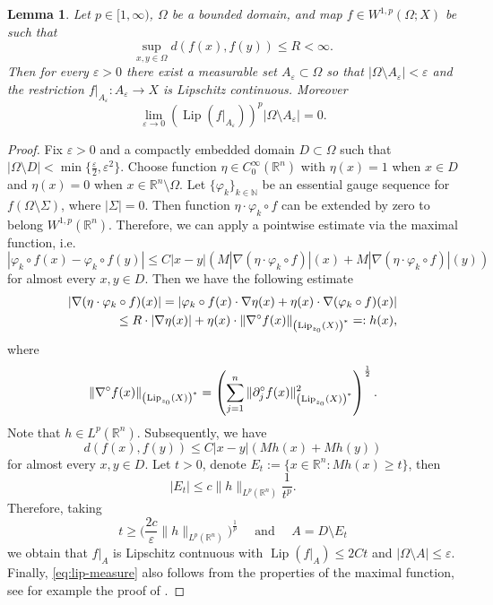 \documentclass[reqno]{amsart}
\newtheorem{lem}[thm]{Lemma}
\begin{document}
\begin{lem}\label{lemma:SobLip}
Let $p\in[1,\infty)$, $\Omega$ be a bounded domain, and map $f \in W^{1,p}(\Omega; X)$ be such that 
\[
\sup_{x,y\in\Omega} d(f(x), f(y)) \leq R <\infty.
\]
Then for every $\varepsilon>0$ there exist a measurable set $A_{\varepsilon}\subset\Omega$
so that $|\Omega\setminus A_\varepsilon|<\varepsilon$ and
the restriction $f|_{A_\varepsilon}:A_\varepsilon\to X$ is Lipschitz continuous. 
Moreover 
\begin{equation}\label{eq:lip-measure}
\lim_{\varepsilon\to 0} \left( \operatorname{Lip}(f|_{A_\varepsilon})\right)^p|\Omega\setminus A_\varepsilon| = 0.
\end{equation}
\end{lem}
\begin{proof}
Fix $\varepsilon>0$ and a compactly embedded domain $D\subset\Omega$ such that $|\Omega\setminus D|<
\min\{\frac{\varepsilon}{2}, \varepsilon^2\}$.
Choose function $\eta\in C^{\infty}_0(\mathbb R^n)$ with $\eta(x)=1$ when $x\in D$ and $\eta(x) = 0$ when $x\in \mathbb R^n\setminus \Omega$.
Let $\{\varphi_k\}_{k\in\mathbb N}$ be an essential gauge sequence for $f(\Omega\setminus\Sigma)$, where $|\Sigma|=0$.
Then function $\eta\cdot\varphi_k\circ f$ can be extended by zero to belong $W^{1,p}(\mathbb R^n)$.
Therefore, we can apply a pointwise estimate via the maximal function, i.e. 
\[
|\varphi_k\circ f(x) - \varphi_k\circ f(y)| \leq
C|x-y|(M|\nabla (\eta\cdot\varphi_k\circ f)|(x) + M|\nabla (\eta\cdot\varphi_k\circ f)|(y))
\]
for almost every $x,y\in D$. Then we have the following estimate
\begin{align}
|\nabla( \eta\cdot\varphi_k\circ f)(x)| = | \varphi_k\circ f(x)\cdot\nabla \eta(x) + \eta(x)\cdot\nabla( \varphi_k\circ f)(x)|\\
\leq R\cdot|\nabla \eta(x)| + \eta(x) \cdot  \|\nabla^\circ f(x)\|_{\left(\textnormal{Lip}_{z_0}(X)\right)^*} =: h(x),
\end{align}
where 
\[
\|\nabla^\circ f(x)\|_{\left(\textnormal{Lip}_{z_0}(X)\right)^*} =  \left(\sum_{j=1}^n \|\partial^\circ_j f(x)\|_{\left(\textnormal{Lip}_{z_0}(X)\right)^*}^2 \right)^{\frac{1}{2}}.
\]
Note that $h\in L^p(\mathbb R^n)$. Subsequently, we have 
\[
d(f(x),f(y)) \leq C|x-y|(Mh(x) + Mh(y)) 
\]
for almost every $x,y\in D$. Let $t>0$, denote $E_t:= \{x\in \mathbb R^n \colon Mh(x) \geq t \}$, then 
\[
|E_t| \leq c\|h\|_{L^p(\mathbb R^n)} \frac{1}{t^p}.
\]
Therefore, taking
\[
t\geq \bigg(\frac{2c}{\varepsilon}\|h\|_{L^p(\mathbb R^n)} \bigg)^{\frac{1}{p}} \quad \text{ and }\quad A = D\setminus E_t
\]
we obtain that $f|_A$ is Lipschitz contnuous with $\operatorname{Lip}(f|_A)\leq 2Ct$ and $|\Omega\setminus A|\leq \varepsilon$.
Finally, \eqref{eq:lip-measure} also follows from the properties of the maximal function, see for example the proof of \cite[Theorem 4.9]{KLV2021}.
\end{proof}
\end{document}
